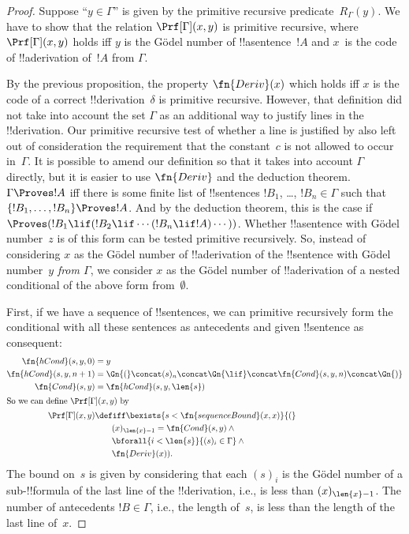 \documentclass[../../../include/open-logic-section]{subfiles}
\begin{document}
\begin{proof}
Suppose ``$y \in \Gamma$'' is given by the primitive recursive
predicate~$R_\Gamma(y)$.  We have to show that the relation
$\Prf[\Gamma](x, y)$ is primitive recursive, where $\Prf[\Gamma](x,
y)$ holds iff $y$ is the G\"odel number of !!a{sentence}~$!A$ and
$x$~is the code of !!a{derivation} of~$!A$ from $\Gamma$.

By the previous proposition, the property $\fn{Deriv}(x)$ which holds
iff $x$ is the code of a correct !!{derivation}~$\delta$ is primitive
recursive. However, that definition did not take into account the set
$\Gamma$ as an additional way to justify lines in the !!{derivation}. Our
primitive recursive test of whether a line is justified by \QR{} also
left out of consideration the requirement that the constant~$c$ is not
allowed to occur in~$\Gamma$. It is possible to amend our definition so
that it takes into account $\Gamma$ directly, but it is easier to use
$\fn{Deriv}$ and the deduction theorem. $\Gamma \Proves !A$ iff
there is some finite list of !!{sentence}s $!B_1$, \dots, $!B_n \in
\Gamma$ such that $\{!B_1, \dots, !B_n\} \Proves !A$. And by the
deduction theorem, this is the case if $\Proves (!B_1 \lif (!B_2 \lif
\cdots (!B_n \lif !A)\cdots))$. Whether !!a{sentence} with G\"odel
number~$z$ is of this form can be tested primitive recursively.  So,
instead of considering $x$ as the G\"odel number of !!a{derivation} of
the !!{sentence} with G\"odel number~$y$ \emph{from $\Gamma$}, we consider
$x$ as the G\"odel number of !!a{derivation} of a nested conditional
of the above form from~$\emptyset$.

First, if we have a sequence of !!{sentence}s, we can primitive
recursively form the conditional with all these sentences as
antecedents and given !!{sentence} as consequent:
\begin{align*}
  \fn{hCond}(s, y, 0) & = y \\
  \fn{hCond}(s, y, n+1) & = \Gn{(} \concat (s)_{n} \concat \Gn{\lif}
  \concat \fn{Cond}(s, y, n) \concat \Gn{)}\\
  \fn{Cond}(s, y) & = \fn{hCond}(s, y, \len{s})\\
  \intertext{So we can define $\Prf[\Gamma](x, y)$ by}
  \Prf[\Gamma](x, y) & \defiff \bexists{s < \fn{sequenceBound}(x,x)}{(} \\
  &\qquad (x)_{\len{x}-1} = \fn{Cond}(s,y) \land {} \\
  &\qquad\bforall{i<\len{s}}{(s)_i \in \Gamma} \land {} \\
  &\qquad\fn{Deriv}(x)).
\end{align*}
The bound on~$s$ is given by considering that each $(s)_i$ is the
G\"odel number of a sub-!!{formula} of the last line of the !!{derivation},
i.e., is less than $(x)_{\len{x}-1}$. The number of antecedents $!B
\in \Gamma$, i.e., the length of~$s$, is less than the length of the
last line of~$x$.
\end{proof}
\end{document}
